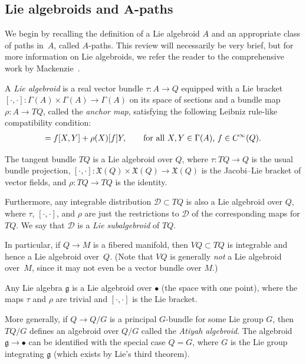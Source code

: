 \documentclass[10pt,a4paper]{amsart}
\numberwithin{equation}{section}
\begin{document}
\subsection[Lie algebroids and $A$-paths]{Lie algebroids and $\boldsymbol{A}$-paths}

We begin by recalling the def\/inition of a Lie algebroid $A$ and an appropriate class of paths in~$A$, called $A$-paths. This review will necessarily be very brief, but for more information on Lie algebroids, we refer the reader to the comprehensive work by Mackenzie~\cite{Mackenzie2005}.

\begin{Definition} A \emph{Lie algebroid} is a real vector bundle $ \tau \colon A \rightarrow Q $ equipped with a Lie bracket $ [ \cdot , \cdot ] \colon \Gamma (A) \times \Gamma (A) \rightarrow \Gamma (A) $ on its space of sections and a bundle map $ \rho \colon A \rightarrow T Q $, called the \emph{anchor map}, satisfying the following Leibniz rule-like compatibility condition:
 \begin{gather*}
 [ X, f Y ] = f [X, Y] + \rho (X) [f] Y, \qquad \text{for all $ X, Y \in \Gamma (A) $, $ f \in C ^\infty (Q) $}.
 \end{gather*}
\end{Definition}

\begin{Example} \label{ex:tangentAlgebroid}
The tangent bundle $ T Q $ is a Lie algebroid over $Q$, where $ \tau \colon T Q \rightarrow Q $ is the usual bundle projection, $ [ \cdot, \cdot ] \colon \mathfrak{X} (Q) \times \mathfrak{X} (Q) \rightarrow \mathfrak{X} (Q) $ is the Jacobi--Lie bracket of vector f\/ields, and $ \rho \colon T Q \rightarrow T Q $ is the identity.

Furthermore, any integrable distribution $ \mathcal{D} \subset T Q $ is also a Lie algebroid over $Q$, where $ \tau $, $ [ \cdot , \cdot ] $, and $ \rho $ are just the restrictions to $\mathcal{D}$ of the corresponding maps for $ T Q $. We say that $\mathcal{D}$ is a \emph{Lie subalgebroid} of $ T Q $.

In particular, if $Q \rightarrow M $ is a f\/ibered manifold, then $ V Q \subset T Q $ is integrable and hence a Lie algebroid over~$Q$. (Note that $ V Q $ is generally \emph{not} a Lie algebroid over~$M$, since it may not even be a vector bundle over $M$.)
\end{Example}

\begin{Example} Any Lie algebra $ \mathfrak{g} $ is a Lie algebroid over $ \bullet $ (the space with one point), where the maps $\tau$ and $\rho$ are trivial and $ [ \cdot , \cdot ] $ is the Lie bracket.

More generally, if $ Q \rightarrow Q/G $ is a principal $G$-bundle for some Lie group $G$, then $ T Q / G $ def\/ines an algebroid over $ Q / G $ called the \emph{Atiyah algebroid}. The algebroid $ \mathfrak{g} \rightarrow \bullet $ can be identif\/ied with the special case $ Q = G $, where $G$ is the Lie group integrating $ \mathfrak{g} $ (which exists by Lie's third theorem).
\end{Example}
\end{document}
